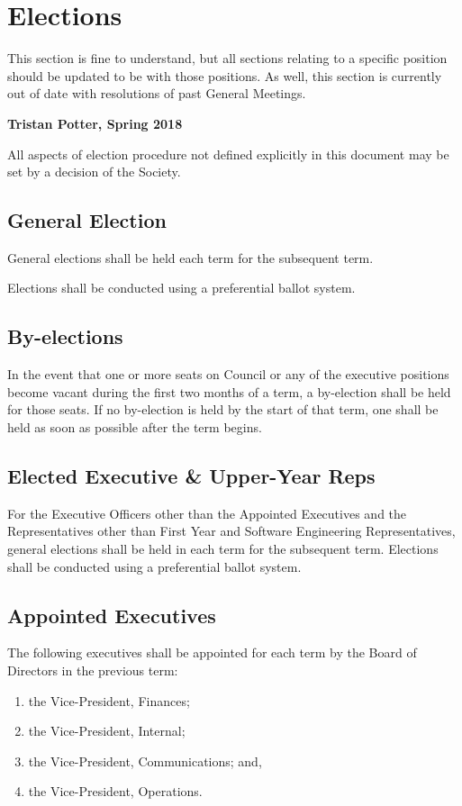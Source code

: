 \section{Elections}
\begin{annotation}
    This section is fine to understand, but all sections relating to a specific
    position should be updated to be with those positions. As well, this 
    section is currently out of date with resolutions of past General Meetings.
    
    \textbf{Tristan Potter, Spring 2018}
\end{annotation}

All aspects of election procedure not defined explicitly in this document may be
set by a decision of the Society.

\subsection{General Election}
General elections shall be held each term for the subsequent term.

Elections shall be conducted using a preferential ballot system.

\subsection{By-elections}
In the event that one or more seats on Council or any of the executive
positions become vacant during the first two months of a term, a by-election shall be held for those seats. If no by-election is held by the start of that
term, one shall be held as soon as possible after the term begins.

\subsection{Elected Executive \& Upper-Year Reps}
For the Executive Officers other than the Appointed Executives and the
Representatives other than First Year and Software Engineering Representatives,
general elections shall be held in each term for the subsequent term. Elections shall be conducted using a preferential ballot system.

\subsection{Appointed Executives}
The following executives shall be appointed for each term by the Board
of Directors in the previous term:
\begin{enumerate} 
    \item the Vice-President, Finances;
    \item the Vice-President, Internal;
    \item the Vice-President, Communications; and,
    \item the Vice-President, Operations.
\end{enumerate}

